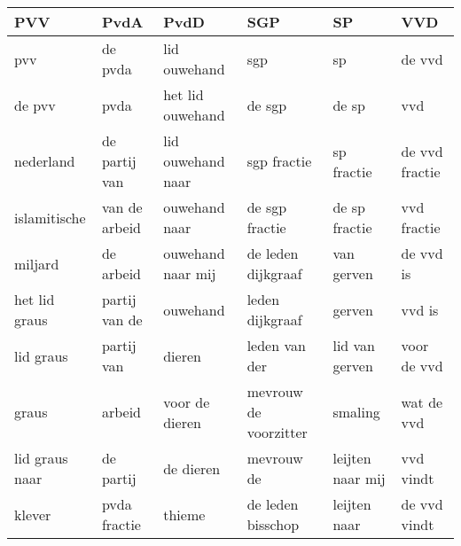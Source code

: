 \begin{tabular}{llllll}
\toprule
            PVV &           PvdA &               PvdD &                    SGP &                SP &             VVD \\
\midrule
            pvv &        de pvda &       lid ouwehand &                    sgp &                sp &          de vvd \\
         de pvv &           pvda &   het lid ouwehand &                 de sgp &             de sp &             vvd \\
      nederland &  de partij van &  lid ouwehand naar &            sgp fractie &        sp fractie &  de vvd fractie \\
   islamitische &  van de arbeid &      ouwehand naar &         de sgp fractie &     de sp fractie &     vvd fractie \\
        miljard &      de arbeid &  ouwehand naar mij &     de leden dijkgraaf &        van gerven &       de vvd is \\
  het lid graus &  partij van de &           ouwehand &        leden dijkgraaf &            gerven &          vvd is \\
      lid graus &     partij van &             dieren &          leden van der &    lid van gerven &     voor de vvd \\
          graus &         arbeid &     voor de dieren &  mevrouw de voorzitter &           smaling &      wat de vvd \\
 lid graus naar &      de partij &          de dieren &             mevrouw de &  leijten naar mij &       vvd vindt \\
         klever &   pvda fractie &             thieme &      de leden bisschop &      leijten naar &    de vvd vindt \\
\bottomrule
\end{tabular}
